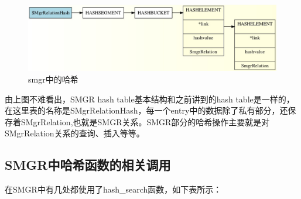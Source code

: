 \documentclass{article}
\begin{document}
\begin{CJK*}{UTF8}{gkai}
\begin{figure}[H]
\centering
\includegraphics[width = \textwidth]{smgr.jpg}
\caption{smgr中的哈希}
\label{overflow}
\end{figure}

\indent 由上图不难看出，SMGR hash table基本结构和之前讲到的hash table是一样的，在这里表的名称是SMgrRelationHash，每一个entry中的数据除了私有部分，还保存着SMgrRelation,也就是SMGR关系。SMGR部分的哈希操作主要就是对SMgrRelation关系的查询、插入等等。

\subsection{SMGR中哈希函数的相关调用}
\indent 在SMGR中有几处都使用了hash\_search函数，如下表所示：


\end{CJK*}
\end{document}
